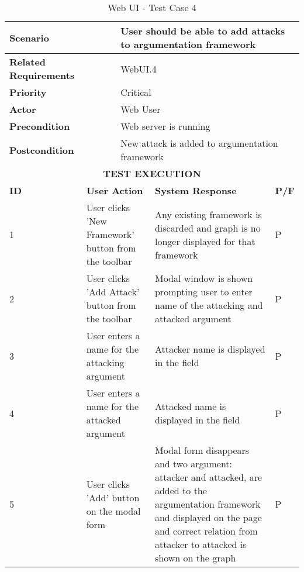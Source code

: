 \begin{longtable}[c]{p{}|p{}|p{}|p{}|p{}}
	\caption{Web UI - Test Case 4}
	\label{table:testcase4} \\
	\hline
	\multicolumn{2}{p{0.3\textwidth}}{\textbf{Scenario}} & \multicolumn{3}{p{0.6\textwidth}}{User should be able to add attacks to argumentation framework} \\ 
	\hline
	\endfirsthead
	\endhead
	\multicolumn{2}{p{0.3\textwidth}}{\textbf{Related Requirements}} & \multicolumn{3}{p{0.6\textwidth}}{WebUI.4} \\ 
	\hline
	\multicolumn{2}{p{0.3\textwidth}}{\textbf{Priority}} & \multicolumn{3}{p{0.6\textwidth}}{Critical} \\ 
	\hline
	\multicolumn{2}{p{0.3\textwidth}}{\textbf{Actor}} & \multicolumn{3}{p{0.6\textwidth}}{Web User} \\ 
	\hline
	\multicolumn{2}{p{0.3\textwidth}}{\textbf{Precondition}} & \multicolumn{3}{p{0.6\textwidth}}{Web server is running} \\ 
	\hline
	\multicolumn{2}{p{0.3\textwidth}}{\textbf{Postcondition}} & \multicolumn{3}{p{0.6\textwidth}}{New attack is added to argumentation framework} \\ 
	\hline
	\multicolumn{5}{c}{\cellcolor{grey}\textbf{TEST EXECUTION}} \\ 
	\hline
	\textbf{ID} & \multicolumn{2}{|p{0.4\textwidth}|}{\textbf{User Action}} & \textbf{System Response} & \textbf{P/F} \\ 
	\hline
	1 & \multicolumn{2}{|p{0.4\textwidth}|}{User clicks 'New Framework' button from the toolbar} & Any existing framework is discarded and graph is no longer displayed for that framework & P \\ 
	\hline
	2 & \multicolumn{2}{|p{0.4\textwidth}|}{User clicks 'Add Attack' button from the toolbar} & Modal window is shown prompting user to enter name of the attacking and attacked argument & P \\ 
	\hline
	3 & \multicolumn{2}{|p{0.4\textwidth}|}{User enters a name for the attacking argument} & Attacker name is displayed in the field & P \\ 
	\hline
	4 & \multicolumn{2}{|p{0.4\textwidth}|}{User enters a name for the attacked argument} & Attacked name is displayed in the field & P \\ 
	\hline
	5 & \multicolumn{2}{|p{0.4\textwidth}|}{User clicks 'Add' button on the modal form} & Modal form disappears and two argument: attacker and attacked, are added to the argumentation framework and displayed on the page and correct relation from attacker to attacked is shown on the graph & P \\ 
	\hline
\end{longtable}


